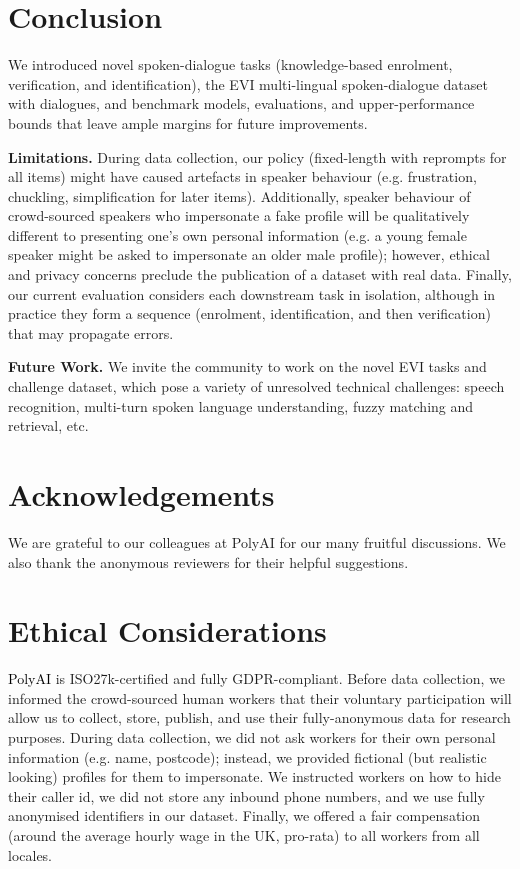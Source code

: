 \documentclass[11pt]{article}
\newcommand{\rparagraph}[1]{\vspace{1.4mm}\noindent\textbf{#1.}}
\begin{document}
{ 
\section{Conclusion}

We introduced novel spoken-dialogue tasks (knowledge-based enrolment, verification, and identification), the EVI multi-lingual spoken-dialogue dataset with  dialogues,
and benchmark models, evaluations, and upper-performance bounds that leave ample margins for future improvements. 

\rparagraph{Limitations}
During data collection, our policy (fixed-length with reprompts for all items) might have caused artefacts in speaker behaviour (e.g. frustration, chuckling, simplification for later items). 
Additionally, speaker behaviour of crowd-sourced speakers
who impersonate a fake profile
will be qualitatively different to presenting one's own personal information
{(e.g. a young female speaker might be asked to impersonate an older male profile)};
however, ethical and privacy concerns preclude the publication of a dataset with real data.
Finally, our current evaluation considers each downstream task in isolation, although in practice they form a sequence (enrolment, identification, and then verification) that may propagate errors.

\rparagraph{Future Work} We invite the community to work on the novel EVI tasks and challenge dataset, which pose a variety of unresolved technical challenges:
speech recognition, multi-turn spoken language understanding, fuzzy matching and retrieval, etc.




 

\section*{Acknowledgements}
We are grateful to our colleagues at PolyAI for our many fruitful discussions.
We also thank the anonymous reviewers for their helpful suggestions.


\section*{Ethical Considerations}
\textcolor{black}{PolyAI} is ISO27k-certified and fully GDPR-compliant.
Before data collection,
we informed the crowd-sourced human workers that
their voluntary participation will allow us to
collect, store, publish, and use their fully-anonymous data for research purposes.
During data collection,
we did not ask workers for their own personal information (e.g. name, postcode);
instead, we provided fictional (but realistic looking) profiles for them to impersonate.
We instructed workers on how to hide their caller id,
we did not store any inbound phone numbers,
and we use fully anonymised identifiers in our dataset.
Finally,
we offered a fair compensation
(around the average hourly wage in the UK, pro-rata)
to all workers from all locales.

}
\end{document}
